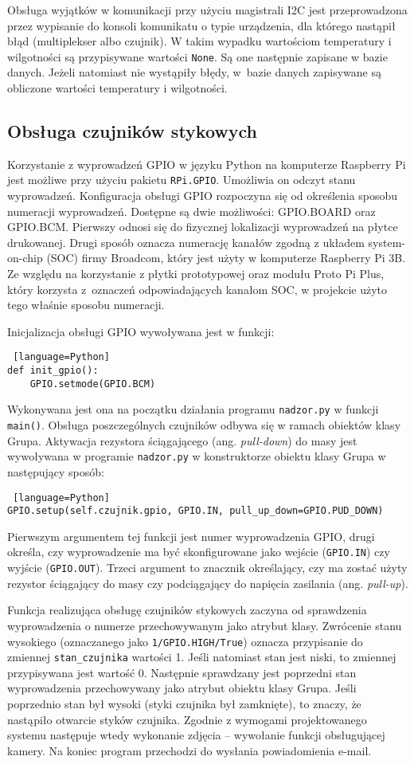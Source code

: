 \documentclass[a4paper,11pt,twoside]{article}
\begin{document}
Obsługa wyjątków w komunikacji przy użyciu magistrali I2C jest przeprowadzona przez wypisanie do konsoli komunikatu o typie urządzenia, dla którego nastąpił błąd (multiplekser albo czujnik). W takim wypadku wartościom temperatury i wilgotności są przypisywane wartości \texttt{None}. Są one następnie zapisane w bazie danych. Jeżeli natomiast nie wystąpiły błędy, w~bazie danych zapisywane są obliczone wartości temperatury i wilgotności.

\subsection{Obsługa czujników stykowych}
Korzystanie z wyprowadzeń GPIO w języku Python na komputerze Raspberry Pi jest możliwe przy użyciu pakietu \texttt{RPi.GPIO}. Umożliwia on odczyt stanu wyprowadzeń. Konfiguracja obsługi GPIO rozpoczyna się od określenia sposobu numeracji wyprowadzeń. Dostępne są dwie możliwości: GPIO.BOARD oraz GPIO.BCM. Pierwszy odnosi się do fizycznej lokalizacji wyprowadzeń na płytce drukowanej. Drugi sposób oznacza numerację kanałów zgodną z układem system-on-chip (SOC) firmy Broadcom, który jest użyty w komputerze Raspberry Pi 3B. Ze względu na korzystanie z płytki prototypowej oraz modułu Proto Pi Plus, który korzysta z~oznaczeń odpowiadających kanałom SOC, w projekcie użyto tego właśnie sposobu numeracji.

Inicjalizacja obsługi GPIO wywoływana jest w funkcji:  
\begin{lstlisting} [language=Python]
def init_gpio():
    GPIO.setmode(GPIO.BCM)
\end{lstlisting}
Wykonywana jest ona na początku działania programu \texttt{nadzor.py} w funkcji \texttt{main()}. Obsługa poszczególnych czujników odbywa się w ramach obiektów klasy Grupa. Aktywacja rezystora ściągającego (ang. \textit{pull-down}) do masy jest wywoływana w programie \texttt{nadzor.py} w konstruktorze obiektu klasy Grupa w następujący sposób:
\begin{lstlisting} [language=Python]
GPIO.setup(self.czujnik.gpio, GPIO.IN, pull_up_down=GPIO.PUD_DOWN)
\end{lstlisting}
Pierwszym argumentem tej funkcji jest numer wyprowadzenia GPIO, drugi określa, czy wyprowadzenie ma być skonfigurowane jako wejście (\texttt{GPIO.IN}) czy wyjście (\texttt{GPIO.OUT}). Trzeci argument to znacznik określający, czy ma zostać użyty rezystor ściągający do masy czy podciągający do napięcia zasilania (ang. \textit{pull-up}).

Funkcja realizująca obsługę czujników stykowych zaczyna od sprawdzenia wyprowadzenia o numerze przechowywanym jako atrybut klasy. Zwrócenie stanu wysokiego (oznaczanego jako \texttt{1/GPIO.HIGH/True}) oznacza przypisanie do zmiennej \texttt{stan{\_}czujnika} wartości 1. Jeśli natomiast stan jest niski, to zmiennej przypisywana jest wartość 0. Następnie sprawdzany jest poprzedni stan wyprowadzenia przechowywany jako atrybut obiektu klasy Grupa. Jeśli poprzednio stan był wysoki (styki czujnika był zamknięte), to znaczy, że nastąpiło otwarcie styków czujnika. Zgodnie z wymogami projektowanego systemu następuje wtedy wykonanie zdjęcia -- wywołanie funkcji obsługującej kamery. Na koniec program przechodzi do wysłania powiadomienia e-mail.
\end{document}
